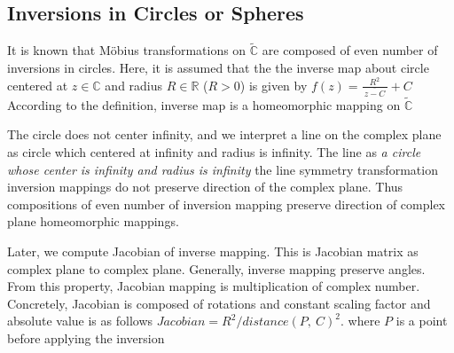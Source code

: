 

\subsection{Inversions in Circles or Spheres}

It is known that M\"obius transformations on $\tilde{\mathbb{C}}$
are composed of even number of inversions in circles.
Here, it is assumed that the the inverse map about circle centered at 
$z\in\mathbb{C}$ and radius $R\in\mathbb{R}$ ($R>0$)
is given by
$f(z) = \frac{R^2}{~\overline{z -C}~} + C$
According to the definition, inverse map is a homeomorphic mapping on
$\tilde{\mathbb{C}}$ 

The circle does not center infinity, and we interpret a line on the
complex plane as circle which centered at infinity and radius is
infinity.
The line as \textit{a circle whose center is infinity and radius is
infinity}
the line symmetry transformation
inversion mappings do not preserve direction of the complex plane.
Thus compositions of even number of inversion mapping preserve direction
of complex plane homeomorphic mappings.

Later, we compute Jacobian of inverse mapping.
This is Jacobian matrix as complex plane to complex plane.
Generally, inverse mapping preserve angles.
From this property, Jacobian mapping is multiplication of complex
number.
Concretely, Jacobian is composed of rotations and constant scaling
factor and absolute value is as follows
$Jacobian = R^2 / distance(P,~C)^2$.
where $P$ is a point before applying the inversion


